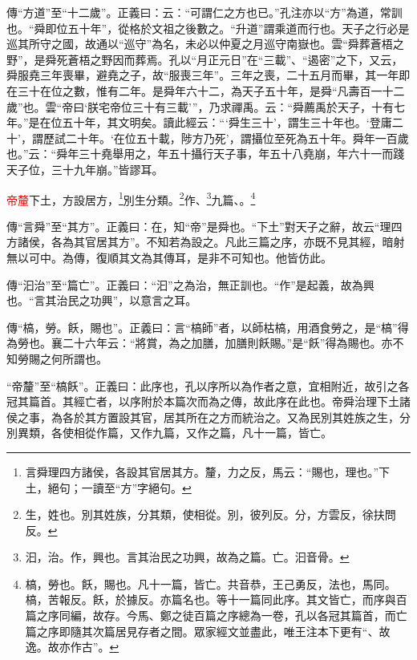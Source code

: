 {\noindent\zhuan{}\fzbyks 傳“方道”至“十二歲”。正義曰：云：“可謂仁之方也已。”孔注亦以“方”為道，常訓也。“舜即位五十年”，從格於文祖之後數之。“升道”謂乘道而行也。天子之行必是巡其所守之國，故通以“巡守”為名，未必以仲夏之月巡守南嶽也。雲“舜葬蒼梧之野”，是舜死蒼梧之野因而葬焉。孔以“月正元日”在“三載”、“遏密”之下，又云，舜服堯三年喪畢，避堯之子，故“服喪三年”。三年之喪，二十五月而畢，其一年即在三十在位之數，惟有二年。是舜年六十二，為天子五十年，是舜“凡壽百一十二歲”也。雲“帝曰‘朕宅帝位三十有三載’”，乃求禪禹。云：“舜薦禹於天子，十有七年。”是在位五十年，其文明矣。讀此經云：“‘舜生三十’，謂生三十年也。‘登庸二十’，謂歷試二十年。‘在位五十載，陟方乃死’，謂攝位至死為五十年。舜年一百歲也。”云：“舜年三十堯舉用之，年五十攝行天子事，年五十八堯崩，年六十一而踐天子位，三十九年崩。”皆謬耳。 \par}

\textcolor{red}{帝釐}下土，方設居方，\footnote{言舜理四方諸侯，各設其官居其方。釐，力之反，馬云：“賜也，理也。”下土，絕句；一讀至“方”字絕句。}別生分類。\footnote{生，姓也。別其姓族，分其類，使相從。別，彼列反。分，方雲反，徐扶問反。}作、\footnote{汩，治。作，興也。言其治民之功興，故為之篇。亡。汩音骨。}九篇、\CJKunderwave{\textcolor{red}{槁飫}}。\footnote{槁，勞也。飫，賜也。凡十一篇，皆亡。共音恭，王己勇反，法也，馬同。槁，苦報反。飫，於據反。亦篇名也。等十一篇同此序。其文皆亡，而序與百篇之序同編，故存。今馬、鄭之徒百篇之序總為一卷，孔以各冠其篇首，而亡篇之序即隨其次篇居見存者之間。眾家經文並盡此，唯王注本下更有“、故逸。故亦作古”。}

{\noindent\zhuan{}\fzbyks 傳“言舜”至“其方”。正義曰：在，知“帝”是舜也。“下土”對天子之辭，故云“理四方諸侯，各為其官居其方”。不知若為設之。凡此三篇之序，亦既不見其經，暗射無以可中。為傳，復順其文為其傳耳，是非不可知也。他皆仿此。 \par}

{\noindent\zhuan{}\fzbyks 傳“汩治”至“篇亡”。正義曰：“汩”之為治，無正訓也。“作”是起義，故為興也。“言其治民之功興”，以意言之耳。 \par}

{\noindent\zhuan{}\fzbyks 傳“槁，勞。飫，賜也”。正義曰：言“槁師”者，以師枯槁，用酒食勞之，是“槁”得為勞也。襄二十六年云：“將賞，為之加膳，加膳則飫賜。”是“飫”得為賜也。亦不知勞賜之何所謂也。 \par}

{\noindent\shu{}\fzkt “帝釐”至“槁飫”。正義曰：此序也，孔以序所以為作者之意，宜相附近，故引之各冠其篇首。其經亡者，以序附於本篇次而為之傳，故此序在此也。帝舜治理下土諸侯之事，為各於其方置設其官，居其所在之方而統治之。又為民別其姓族之生，分別異類，各使相從作篇，又作九篇，又作之篇，凡十一篇，皆亡。 \par}

